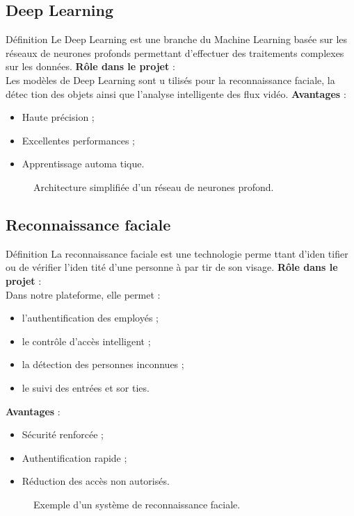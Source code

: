 \documentclass[12pt,a4paper]{report}
\numberwithin{figure}{chapter}
\numberwithin{table}{chapter}
\begin{document}
\subsection{Deep Learning}
Déﬁnition
Le Deep Learning est une branche du Machine Learning basée sur les réseaux de neurones profonds
permettant d’eﬀectuer des traitements complexes sur les données.
\textbf{Rôle dans le projet} : \\
Les modèles de Deep Learning sont u tilisés pour la reconnaissance faciale, la détec tion des objets
ainsi que l’analyse intelligente des ﬂux vidéo.
\textbf{Avantages} : \\
\begin{itemize}
  \item Haute précision ;
  \item Excellentes performances ;
  \item Apprentissage automa tique.
\end{itemize}
\begin{figure}[H]
  \centering
  \caption{Architecture simpliﬁée d’un réseau de neurones profond.}
\end{figure}
\subsection{Reconnaissance faciale}
Déﬁnition
La reconnaissance faciale est une technologie perme ttant d’iden tiﬁer ou de vériﬁer l’iden tité d’une
personne à par tir de son visage.
\textbf{Rôle dans le projet} : \\
Dans notre plateforme, elle permet :
\begin{itemize}
  \item l’authentiﬁcation des employés ;
  \item le contrôle d’accès intelligent ;
  \item la détection des personnes inconnues ;
  \item le suivi des entrées et sor ties.
\end{itemize}
\textbf{Avantages} : \\
\begin{itemize}
  \item Sécurité renforcée ;
  \item Authentiﬁcation rapide ;
  \item Réduction des accès non autorisés.
\end{itemize}
\begin{figure}[H]
  \centering
  \caption{Exemple d’un système de reconnaissance faciale.}
\end{figure}
\end{document}

